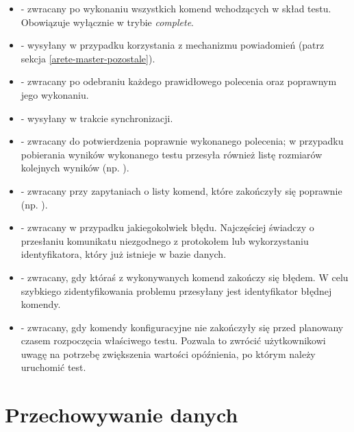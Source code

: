 \documentclass[00-praca-magisterska.tex]{subfiles}
\begin{document}
\begin{itemize}
  \setlength{\itemsep}{10pt}

\item{ - zwracany po wykonaniu wszystkich komend
wchodzących w skład testu. Obowiązuje wyłącznie w trybie \emph{complete}.}

\item{ - wysyłany w
przypadku korzystania z mechanizmu powiadomień (patrz sekcja \ref{arete-master-pozostale}).}

\item{ - zwracany po odebraniu każdego prawidłowego polecenia oraz
poprawnym jego wykonaniu.}

\item{ - wysyłany w trakcie synchronizacji.}

\item{ - zwracany do potwierdzenia poprawnie wykonanego
polecenia; w przypadku pobierania wyników wykonanego testu przesyła również
listę rozmiarów kolejnych wyników (np. ).}

\item{ - zwracany przy zapytaniach o listy
komend, które zakończyły się poprawnie (np. ).}

\item{ - zwracany w przypadku jakiegokolwiek błędu. Najczęściej
świadczy o przesłaniu komunikatu niezgodnego z protokołem lub wykorzystaniu
identyfikatora, który już istnieje w bazie danych.}

\item{ - zwracany, gdy któraś z wykonywanych
komend zakończy się błędem. W celu szybkiego zidentyfikowania problemu
przesyłany jest identyfikator błędnej komendy.}

\item{ - zwracany, gdy komendy konfiguracyjne nie zakończyły
się przed planowany czasem rozpoczęcia właściwego testu. Pozwala to zwrócić
użytkownikowi uwagę na potrzebę zwiększenia wartości opóźnienia, po którym
należy uruchomić test.}

\end{itemize}

\section{Przechowywanie danych}
\label{arete-slave-przechowywanie danych}
\end{document}
